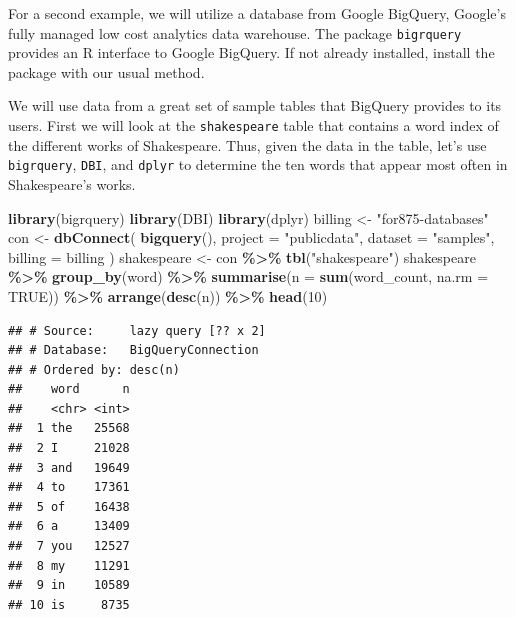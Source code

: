\documentclass[
]{krantz}
\newenvironment{Shaded}{\begin{snugshade}}{\end{snugshade}}
\newcommand{\DataTypeTok}[1]{\textcolor[rgb]{0.13,0.29,0.53}{#1}}
\newcommand{\DecValTok}[1]{\textcolor[rgb]{0.00,0.00,0.81}{#1}}
\newcommand{\KeywordTok}[1]{\textcolor[rgb]{0.13,0.29,0.53}{\textbf{#1}}}
\newcommand{\NormalTok}[1]{#1}
\newcommand{\OperatorTok}[1]{\textcolor[rgb]{0.81,0.36,0.00}{\textbf{#1}}}
\newcommand{\OtherTok}[1]{\textcolor[rgb]{0.56,0.35,0.01}{#1}}
\newcommand{\StringTok}[1]{\textcolor[rgb]{0.31,0.60,0.02}{#1}}
\begin{document}
For a second example, we will utilize a database from Google BigQuery, Google's fully managed low cost analytics data warehouse. The package \texttt{bigrquery} provides an R interface to Google BigQuery. If not already installed, install the package with our usual method.

We will use data from a great set of sample tables that BigQuery provides to its users. First we will look at the \texttt{shakespeare} table that contains a word index of the different works of Shakespeare. Thus, given the data in the table, let's use \texttt{bigrquery}, \texttt{DBI}, and \texttt{dplyr} to determine the ten words that appear most often in Shakespeare's works.

\begin{Shaded}
\begin{Highlighting}[]
\KeywordTok{library}\NormalTok{(bigrquery)}
\KeywordTok{library}\NormalTok{(DBI)}
\KeywordTok{library}\NormalTok{(dplyr)}
\NormalTok{billing \textless{}{-}}\StringTok{ "for875{-}databases"}
\NormalTok{con \textless{}{-}}\StringTok{ }\KeywordTok{dbConnect}\NormalTok{(}
  \KeywordTok{bigquery}\NormalTok{(),}
  \DataTypeTok{project =} \StringTok{"publicdata"}\NormalTok{,}
  \DataTypeTok{dataset =} \StringTok{"samples"}\NormalTok{,}
  \DataTypeTok{billing =}\NormalTok{ billing}
\NormalTok{)}
\NormalTok{shakespeare \textless{}{-}}\StringTok{ }\NormalTok{con }\OperatorTok{\%\textgreater{}\%}
\StringTok{  }\KeywordTok{tbl}\NormalTok{(}\StringTok{"shakespeare"}\NormalTok{)}
\NormalTok{shakespeare }\OperatorTok{\%\textgreater{}\%}
\StringTok{  }\KeywordTok{group\_by}\NormalTok{(word) }\OperatorTok{\%\textgreater{}\%}
\StringTok{  }\KeywordTok{summarise}\NormalTok{(}\DataTypeTok{n =} \KeywordTok{sum}\NormalTok{(word\_count, }\DataTypeTok{na.rm =} \OtherTok{TRUE}\NormalTok{)) }\OperatorTok{\%\textgreater{}\%}
\StringTok{  }\KeywordTok{arrange}\NormalTok{(}\KeywordTok{desc}\NormalTok{(n)) }\OperatorTok{\%\textgreater{}\%}
\StringTok{  }\KeywordTok{head}\NormalTok{(}\DecValTok{10}\NormalTok{)}
\end{Highlighting}
\end{Shaded}

\begin{verbatim}
## # Source:     lazy query [?? x 2]
## # Database:   BigQueryConnection
## # Ordered by: desc(n)
##    word      n
##    <chr> <int>
##  1 the   25568
##  2 I     21028
##  3 and   19649
##  4 to    17361
##  5 of    16438
##  6 a     13409
##  7 you   12527
##  8 my    11291
##  9 in    10589
## 10 is     8735
\end{verbatim}
\end{document}
